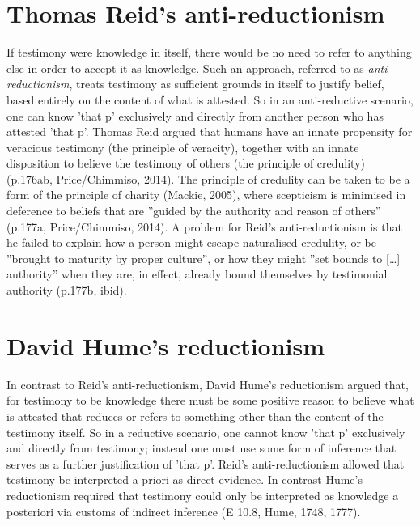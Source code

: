 \documentclass[a4paper, 11pt]{article} %
\begin{document}

\section*{Thomas Reid's anti-reductionism}

If testimony were knowledge in itself, there would be no need to refer to anything else in order to accept it as knowledge. Such an approach, referred to as \textit{anti-reductionism}, treats testimony as sufficient grounds in itself to justify belief, based entirely on the content of what is attested. So in an anti-reductive scenario, one can know 'that p' exclusively and directly from another person who has attested 'that p'. Thomas Reid argued that humans have an innate propensity for veracious testimony (the principle of veracity), together with an innate disposition to believe the testimony of others (the principle of credulity) (p.176ab, Price/Chimmiso, 2014)\cite{Price/Chismisso:2014}. The principle of credulity can be taken to be a form of the principle of charity (Mackie, 2005)\cite{Mackie:2005}, where scepticism is minimised in deference to beliefs that are ''guided by the authority and reason of others'' (p.177a, Price/Chimmiso, 2014)\cite{Price/Chismisso:2014}. A problem for Reid's anti-reductionism is that he failed to explain how a person might escape naturalised credulity, or be ''brought to maturity by proper culture'', or how they might ''set bounds to [\dots] authority'' when they are, in effect, already bound themselves by testimonial authority (p.177b, ibid)\cite{Price/Chismisso:2014}.


\section*{David Hume's reductionism}

In contrast to Reid's anti-reductionism, David Hume's reductionism argued that, for testimony to be knowledge there must be some positive reason to believe what is attested that reduces or refers to something other than the content of the testimony itself. So in a reductive scenario, one cannot know 'that p' exclusively and directly from testimony; instead one must use some form of inference that serves as a further justification of 'that p'. Reid's anti-reductionism allowed that testimony be interpreted a priori as direct evidence. In contrast Hume's reductionism required that testimony could only be interpreted as knowledge a posteriori via customs of indirect inference (E 10.8, Hume, 1748, 1777)\cite{Hume:1748}.
\end{document}
